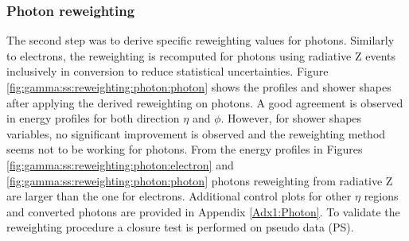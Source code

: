 \subsubsection{Photon reweighting}
The second step was to derive specific reweighting values for photons. Similarly to electrons, the reweighting is recomputed for photons using radiative Z events inclusively in conversion to reduce statistical uncertainties. Figure \ref{fig:gamma:ss:reweighting:photon:photon} shows the profiles and shower shapes after applying the derived reweighting on photons. A good agreement is observed in energy profiles for both direction $\eta$ and $\phi$. However, for shower shapes variables, no significant improvement is observed and the reweighting method seems not to be working for photons. From the energy profiles in Figures \ref{fig:gamma:ss:reweighting:photon:electron} and \ref{fig:gamma:ss:reweighting:photon:photon} photons reweighting from radiative Z are larger than the one for electrons. Additional control plots for other $\eta$ regions and converted photons are provided in Appendix \ref{Adx1:Photon}. To validate the reweighting procedure a closure test is performed on pseudo data (PS).
